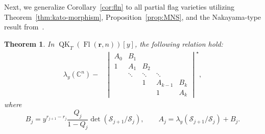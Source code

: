 \documentclass[11pt]{article}
\numberwithin{equation}{section}
\numberwithin{equation}{section}
\newtheorem{Theorem}{Theorem}[section]
\theoremstyle{definition}
\DeclareMathOperator{\Fl}{Fl}
\DeclareMathOperator{\QK}{QK}
\newcommand{\bfr}{{\mathbf r}}
\newcommand{\C}{{\mathbb C}}
\newcommand{\cS}{{\mathcal S}}
\begin{document}
Next, we generalize Corollary~\ref{cor:fln} to all partial flag varieties utilizing Theorem~\ref{thm:kato-morphism}, Proposition~\ref{prop:MNS}, and the Nakayama-type result from~\cite{GMSXZZ:QKW, gu2022quantum}.

\begin{Theorem}\label{thm:whit-short}
 In $\QK_T(\Fl(\bfr,n))[y]$, the following relation hold:
 \begin{align}\label{eqn:whit-short}
 \lambda_y(\C^n)-
 &\begin{vmatrix}
 A_0 & B_1 & & & \\
 1 & A_1 & B_2 & & \\ & \ddots & \ddots & \ddots & \\ & & 1 & A_{k-1} & B_{k}\\ & & & 1 & A_{k}
 \end{vmatrix}^\star,
 \end{align}
 where \[
 B_j=y^{r_{j+1}-r_j}\frac{Q_j}{1-Q_j}\det(\cS_{j+1}/\cS_j),\qquad
 A_j=\lambda_y(\cS_{j+1}/\cS_j)+B_j.
\]
\end{Theorem}
\end{document}
